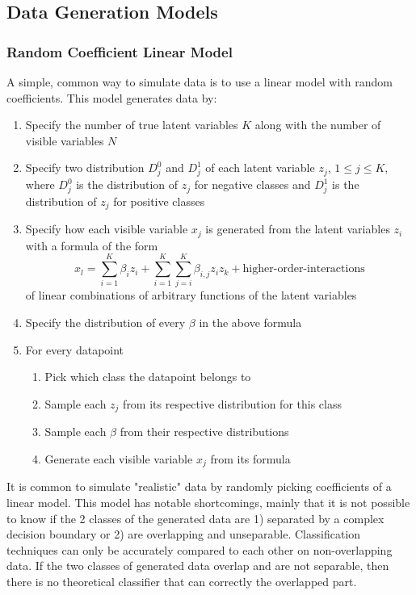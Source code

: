 \documentclass{article}
\begin{document}
\subsection{Data Generation Models}

\subsubsection{Random Coefficient Linear Model}

A simple, common way to simulate data is to use a linear model with random
coefficients. This model generates data by:
\begin{enumerate}
    \item Specify the number of true latent variables $K$ along with the number
        of visible variables $N$
    \item Specify two distribution $D_j^0$ and $D_j^1$ of each latent variable
        $z_j$, $1 \leq j \leq K$, where $D_j^0$ is the distribution of $z_j$
        for negative classes and $D_j^1$ is the distribution of $z_j$ for
        positive classes
    \item Specify how each visible variable $x_j$ is generated from the latent
        variables $z_i$ with a formula of the form
        $$x_l = \sum_{i=1}^K \beta_i z_i + \sum_{i=1}^K\sum_{j=i}^K \beta_{i,j} z_i z_k + \text{higher-order-interactions}$$
        of linear combinations of arbitrary functions of the latent variables
    \item Specify the distribution of every $\beta$ in the above formula
    \item For every datapoint
    \begin{enumerate}
        \item Pick which class the datapoint belongs to
        \item Sample each $z_j$ from its respective distribution for this class
        \item Sample each $\beta$ from their respective distributions
        \item Generate each visible variable $x_j$ from its formula
    \end{enumerate}
\end{enumerate}

It is common to simulate "realistic" data by randomly picking coefficients of a
linear model. This model has notable shortcomings, mainly that it is not
possible to know if the 2 classes of the generated data are 1) separated by a
complex decision boundary or 2) are overlapping and unseparable. Classification
techniques can only be accurately compared to each other on non-overlapping
data. If the two classes of generated data overlap and are not separable, then
there is no theoretical classifier that can correctly the overlapped part.
\end{document}
